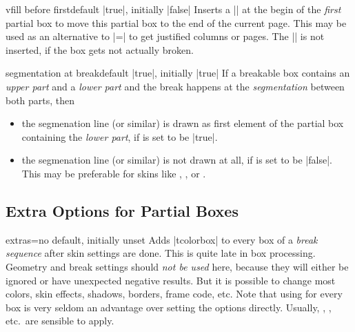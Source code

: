 \begin{docTcbKey}{vfill before first}{}{default |true|, initially |false|}
  Inserts a |\vfill| at the begin of the \emph{first} partial box to move this
  partial box to the end of the current page. This may be used as an alternative
  to |=| to get justified
  columns or pages. The |\vfill| is not inserted, if the box gets not
  actually broken.
\end{docTcbKey}


\begin{docTcbKey}[][doc new=2017-03-20]{segmentation at break}{}{default |true|, initially |true|}
  If a breakable box contains an \emph{upper part} and a \emph{lower part} and
  the break happens at the \emph{segmentation} between both parts, then
  \begin{itemize}
  \item the segmenation line (or similar) is drawn as first element of the
    partial box containing the \emph{lower part}, if 
    is set to be |true|.
  \item the segmenation line (or similar) is not drawn at all, if
     is set to be |false|.
    This may be preferable for skins like , ,
    or .
  \end{itemize}
\end{docTcbKey}


\clearpage
\subsection{Extra Options for Partial Boxes}\label{subsec:extras}


\begin{docTcbKey}[][doc new=2015-07-16]{extras}{=}{no default, initially unset}
  Adds |tcolorbox|  to every box of a \emph{break sequence}
  after skin settings are done. This is quite late in box processing.
  Geometry and break settings should \emph{not be used} here, because they
  will either be ignored or have unexpected negative results. But it is possible
  to change most colors, skin effects, shadows, borders, frame code, etc.
  Note that using  for every box is very seldom an
  advantage over setting the options directly. Usually, ,
  , etc.\ are sensible to apply.
\end{docTcbKey}



